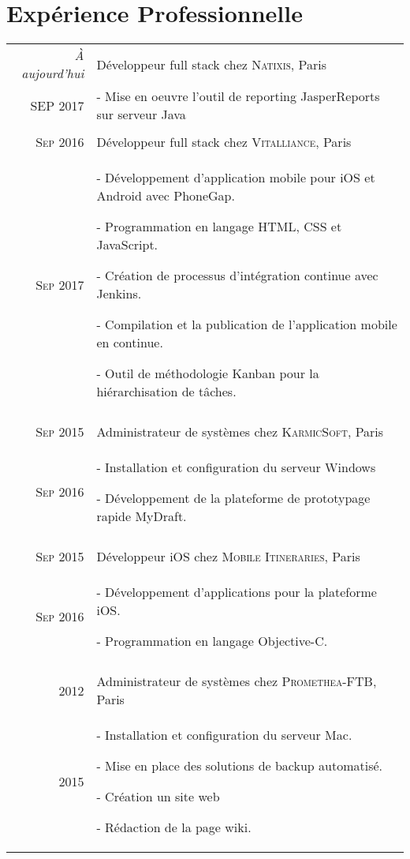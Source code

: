 \documentclass[a4paper,10pt]{article}
\begin{document}
\section{Expérience Professionnelle}
\begin{tabular}{r|p{11cm}}
 \emph{À aujourd'hui} & Développeur full stack chez \textsc{Natixis}, Paris \\\textsc{SEP 2017}&\footnotesize{-	Mise en oeuvre l'outil de reporting JasperReports sur serveur Java}\\\multicolumn{2}{c}{} \\
 \textsc{Sep 2016} & Développeur full stack chez \textsc{Vitalliance}, Paris \\\textsc{Sep 2017} &\footnotesize{-	Développement d'application mobile pour iOS et Android avec PhoneGap.

-	Programmation en langage HTML, CSS et JavaScript.

-	Création de processus d'intégration continue avec Jenkins.

-	Compilation et la publication de l'application mobile en continue.

-	Outil de méthodologie Kanban pour la hiérarchisation de tâches.}\\\multicolumn{2}{c}{} \\
\textsc{Sep 2015} & Administrateur de systèmes chez \textsc{KarmicSoft}, Paris \\\textsc{Sep 2016} &\footnotesize{-	Installation et configuration du serveur Windows

-	Développement de la plateforme de prototypage rapide MyDraft.}\\\multicolumn{2}{c}{} \\ 
\textsc{Sep 2015} & Développeur iOS  chez \textsc{Mobile Itineraries}, Paris \\\textsc{Sep 2016} & \footnotesize{-	Développement d'applications pour la plateforme iOS.

-	Programmation en langage Objective-C.}\\\multicolumn{2}{c}{} \\ 
\textsc{2012} & Administrateur de systèmes chez \textsc{Promethea-FTB}, Paris \\\textsc{2015} & \footnotesize{-	Installation et configuration du serveur Mac. 

-	Mise en place des solutions de backup automatisé.

-	Création un site web

-	Rédaction de la page wiki.

}

\end{tabular}
\end{document}
